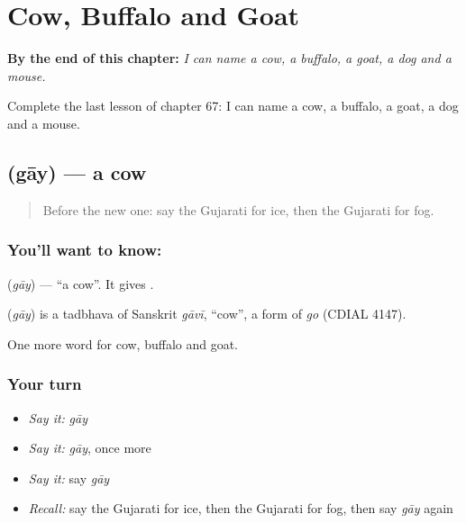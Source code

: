 
\chapter{Cow, Buffalo and Goat}
\label{ch:gu-cow-buffalo-and-goat}

\begin{chapteropening}
\textbf{By the end of this chapter:} \emph{I can name a cow, a buffalo, a goat, a dog and a mouse.}

Complete the last lesson of chapter 67: I can name a cow, a buffalo, a goat, a dog and a mouse.
\end{chapteropening}

\section[\texorpdfstring{\gu{ગાય} (gāy)}{ગાય (gāy)}]{ (gāy) — a cow}

\label{lesson:GU-C67-cow}



\begin{quote}
Before the new one: say the Gujarati for ice, then the Gujarati for fog.
\end{quote}

\subsection*{You'll want to know: }
\textbf{} (\emph{gāy}) — \textquotedblleft{}a cow\textquotedblright{}. It gives \textbf{}.

\begin{cousinweb}
\textbf{} (\emph{gāy}) is a tadbhava of Sanskrit \emph{gāvī}, \textquotedblleft{}cow\textquotedblright{}, a form of \emph{go} (CDIAL 4147).
\end{cousinweb}

\begin{grammarlens}[title={What you've built}]
One more word for cow, buffalo and goat.
\end{grammarlens}

\subsection*{Your turn}
\begin{itemize}
\raggedright
  \item \emph{Say it:} \emph{gāy}
  \item \emph{Say it:} \emph{gāy}, once more
  \item \emph{Say it:} say \emph{gāy}
  \item \emph{Recall:} say the Gujarati for ice, then the Gujarati for fog, then say \emph{gāy} again
\end{itemize}

